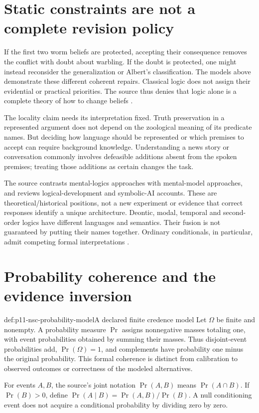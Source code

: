 \section{Static constraints are not a complete revision policy}
\label{sec:p11-nsc-revision}

If the first two worm beliefs are protected, accepting their consequence
removes the conflict with doubt about warbling. If the doubt is protected,
one might instead reconsider the generalization or Albert's classification.
The models above demonstrate these different coherent repairs. Classical
logic does not assign their evidential or practical priorities. The source
thus denies that logic alone is a complete theory of how to change beliefs
\cite[p.~15]{ChaterOaksford2012NormativeSystems}.

The locality claim needs its interpretation fixed. Truth preservation in
a represented argument does not depend on the zoological meaning of its
predicate names. But deciding how language should be represented or which
premises to accept can require background knowledge. Understanding a news
story or conversation commonly involves defeasible additions absent from
the spoken premises; treating those additions as certain changes the task.

The source contrasts mental-logics approaches with mental-model approaches,
and reviews logical-development and symbolic-AI accounts. These are
theoretical/historical positions, not a new experiment or evidence that
correct responses identify a unique architecture. Deontic, modal, temporal
and second-order logics have different languages and semantics. Their
fusion is not guaranteed by putting their names together. Ordinary
conditionals, in particular, admit competing formal interpretations
\cite[pp.~13--15]{ChaterOaksford2012NormativeSystems}.

\section{Probability coherence and the evidence inversion}
\label{sec:p11-nsc-probability}

\begin{hbdefinition}{def:p11-nsc-probability-model}{A declared finite credence model}
Let \(\Omega\) be finite and nonempty. A probability measure \(\Pr\)
assigns nonnegative masses totaling one, with event probabilities obtained
by summing their masses. Thus disjoint-event probabilities add,
\(\Pr(\Omega)=1\), and complements have probability one minus the
original probability. This formal coherence is distinct from calibration
to observed outcomes or correctness of the modeled alternatives.

For events \(A,B\), the source's joint notation \(\Pr(A,B)\) means
\(\Pr(A\cap B)\). If \(\Pr(B)>0\), define
\(\Pr(A\mid B)=\Pr(A,B)/\Pr(B)\). A null conditioning event
does not acquire a conditional probability by dividing zero by zero.
\end{hbdefinition}

